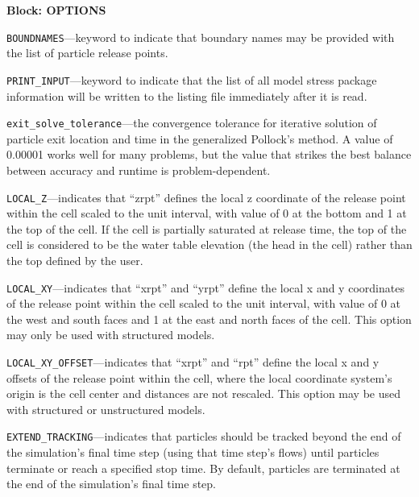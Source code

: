 
\item \textbf{Block: OPTIONS}

\begin{description}
\item \texttt{BOUNDNAMES}---keyword to indicate that boundary names may be provided with the list of particle release points.

\item \texttt{PRINT\_INPUT}---keyword to indicate that the list of all model stress package information will be written to the listing file immediately after it is read.

\item \texttt{exit\_solve\_tolerance}---the convergence tolerance for iterative solution of particle exit location and time in the generalized Pollock's method.  A value of 0.00001 works well for many problems, but the value that strikes the best balance between accuracy and runtime is problem-dependent.

\item \texttt{LOCAL\_Z}---indicates that ``zrpt'' defines the local z coordinate of the release point within the cell scaled to the unit interval, with value of 0 at the bottom and 1 at the top of the cell.  If the cell is partially saturated at release time, the top of the cell is considered to be the water table elevation (the head in the cell) rather than the top defined by the user.

\item \texttt{LOCAL\_XY}---indicates that ``xrpt'' and ``yrpt'' define the local x and y coordinates of the release point within the cell scaled to the unit interval, with value of 0 at the west and south faces and 1 at the east and north faces of the cell. This option may only be used with structured models.

\item \texttt{LOCAL\_XY\_OFFSET}---indicates that ``xrpt'' and ``rpt'' define the local x and y offsets of the release point within the cell, where the local coordinate system's origin is the cell center and distances are not rescaled. This option may be used with structured or unstructured models.

\item \texttt{EXTEND\_TRACKING}---indicates that particles should be tracked beyond the end of the simulation's final time step (using that time step's flows) until particles terminate or reach a specified stop time.  By default, particles are terminated at the end of the simulation's final time step.


\end{description}
